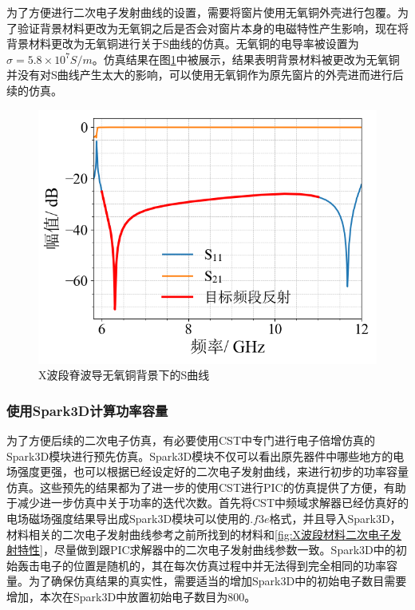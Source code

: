 \documentclass[master]{thesis-uestc}
\begin{document}
为了方便进行二次电子发射曲线的设置，需要将窗片使用无氧铜外壳进行包覆。为了验证背景材料更改为无氧铜之后是否会对窗片本身的电磁特性产生影响，现在将背景材料更改为无氧铜进行关于S曲线的仿真。无氧铜的电导率被设置为$\sigma = 5.8 \times 10^7 S/m$。仿真结果在图\ref{fig:X无氧铜背景}中被展示，结果表明背景材料被更改为无氧铜并没有对S曲线产生太大的影响，可以使用无氧铜作为原先窗片的外壳进而进行后续的仿真。
\begin{figure}[!htb]
    \centering
    \includegraphics[width=0.5\linewidth]{pic/chapter3/X脊波导窗无氧铜.png}
    \caption{X波段脊波导无氧铜背景下的S曲线}
    \label{fig:X无氧铜背景}
\end{figure}

\subsubsection{使用Spark3D计算功率容量}
为了方便后续的二次电子仿真，有必要使用CST中专门进行电子倍增仿真的Spark3D模块进行预先仿真。Spark3D模块不仅可以看出原先器件中哪些地方的电场强度更强，也可以根据已经设定好的二次电子发射曲线，来进行初步的功率容量仿真。这些预先的结果都为了进一步的使用CST进行PIC的仿真提供了方便，有助于减少进一步仿真中关于功率的迭代次数。首先将CST中频域求解器已经仿真好的电场磁场强度结果导出成Spark3D模块可以使用的$.f3e$格式，并且导入Spark3D，材料相关的二次电子发射曲线参考之前所找到的材料和\ref{fig:X波段材料二次电子发射特性}，尽量做到跟PIC求解器中的二次电子发射曲线参数一致。Spark3D中的初始轰击电子的位置是随机的，其在每次仿真过程中并无法得到完全相同的功率容量。为了确保仿真结果的真实性，需要适当的增加Spark3D中的初始电子数目需要增加，本次在Spark3D中放置初始电子数目为800。
\end{document}
